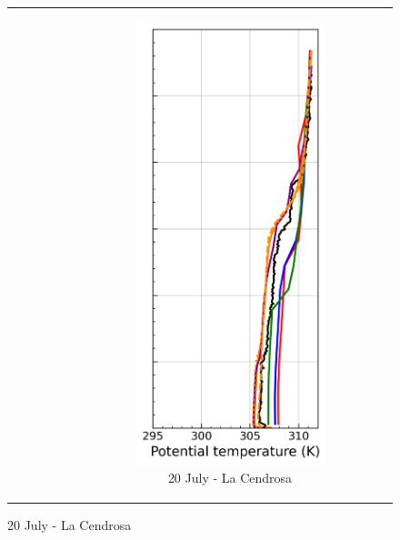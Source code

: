 \begin{figure}[hbtp]
{\begin{tabular}{@{}cccc@{}}
\begin{subfigure}[t]{0.29\textwidth}
        \end{subfigure} &
        \begin{subfigure}[t]{0.285\textwidth}
            \caption{20 July - La Cendrosa}
            \includegraphics[width=\textwidth]{images/chap6/profiles/profile_cendrosa_theta_2007_sensbins.png}

\end{subfigure}
\end{tabular}}
\end{figure}
